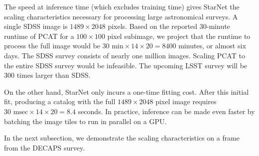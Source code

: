 The speed at inference time (which excludes training time) gives StarNet the scaling characteristics necessary for processing large astronomical surveys.
A single SDSS image is $1489 \times 2048$ pixels.
Based on the reported 30-minute runtime of PCAT for a $100\times100$ pixel subimage, we project that
the runtime to process the full image would be $30\text{ min} \times 14 \times 20 = 8400$ minutes, or almost six days.
The SDSS survey consists of nearly one million images. Scaling PCAT to the entire SDSS survey would be infeasible.
The upcoming LSST survey will be 300 times larger than SDSS.

On the other hand, StarNet only incurs a one-time fitting cost.
After this initial fit,
producing a catalog with the full $1489 \times 2048$ pixel image requires
$30\text{ msec} \times 14 \times 20 = 8.4$ seconds. In practice,
inference can be made even faster by batching the image tiles to run in parallel on a GPU.

In the next subsection, we demonstrate the scaling characteristics on a frame from
the DECAPS survey.





